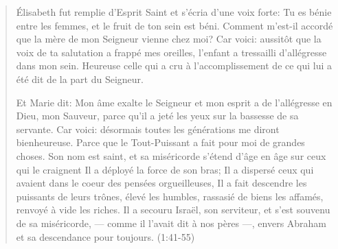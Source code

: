 

\begin{quote}
Élisabeth fut remplie d’Esprit Saint et s’écria d’une voix forte: Tu es bénie entre les femmes, et le fruit de ton sein est béni. Comment m’est-il accordé que la mère de mon Seigneur vienne chez moi? Car voici: aussitôt que la voix de ta salutation a frappé mes oreilles, l’enfant a tressailli d’allégresse dans mon sein. Heureuse celle qui a cru à l’accomplissement de ce qui lui a été dit de la part du Seigneur.

Et Marie dit: Mon âme exalte le Seigneur et mon esprit a de l’allégresse en Dieu, mon Sauveur, parce qu’il a jeté les yeux sur la bassesse de sa servante. Car voici: désormais toutes les générations me diront bienheureuse. Parce que le Tout-Puissant a fait pour moi de grandes choses. Son nom est saint, et sa miséricorde s’étend d’âge en âge sur ceux qui le craignent Il a déployé la force de son bras; Il a dispersé ceux qui avaient dans le coeur des pensées orgueilleuses, Il a fait descendre les puissants de leurs trônes, élevé les humbles, rassasié de biens les affamés, renvoyé à vide les riches. Il a secouru Israël, son serviteur, et s’est souvenu de sa miséricorde, — comme il l’avait dit à nos pères —, envers Abraham et sa descendance pour toujours.
(1:41-55)
\end{quote}

